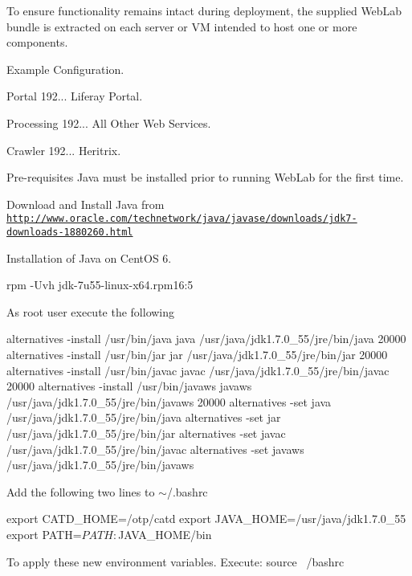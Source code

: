 To ensure functionality remains intact during deployment, the supplied Web\+Lab bundle is extracted on each server or V\+M intended to host one or more components.


\begin{DoxyItemize}
\item Example Configuration.
\begin{DoxyEnumerate}
\item Portal  192... Liferay Portal.
\item Processing  192... All Other Web Services.
\item Crawler  192... Heritrix.
\end{DoxyEnumerate}
\end{DoxyItemize}

Pre-\/requisites Java must be installed prior to running Web\+Lab for the first time.

Download and Install Java from \href{http://www.oracle.com/technetwork/java/javase/downloads/jdk7-downloads-1880260.html}{\tt http\+://www.\+oracle.\+com/technetwork/java/javase/downloads/jdk7-\/downloads-\/1880260.\+html}

Installation of Java on Cent\+O\+S 6. 
\begin{DoxyCode}
rpm -Uvh jdk-7u55-linux-x64.rpm16:5
\end{DoxyCode}


As root user execute the following 
\begin{DoxyCode}
alternatives -install /usr/bin/java java /usr/java/jdk1.7.0\_55/jre/bin/java 20000
alternatives -install /usr/bin/jar jar /usr/java/jdk1.7.0\_55/jre/bin/jar 20000
alternatives -install /usr/bin/javac javac /usr/java/jdk1.7.0\_55/jre/bin/javac 20000
alternatives -install /usr/bin/javaws javaws /usr/java/jdk1.7.0\_55/jre/bin/javaws 20000
alternatives -set java /usr/java/jdk1.7.0\_55/jre/bin/java
alternatives -set jar /usr/java/jdk1.7.0\_55/jre/bin/jar
alternatives -set javac /usr/java/jdk1.7.0\_55/jre/bin/javac
alternatives -set javaws /usr/java/jdk1.7.0\_55/jre/bin/javaws
\end{DoxyCode}


Add the following two lines to $\sim$/.bashrc 
\begin{DoxyCode}
export CATD\_HOME=/otp/catd
export JAVA\_HOME=/usr/java/jdk1.7.0\_55
export PATH=$PATH:$JAVA\_HOME/bin
\end{DoxyCode}



\begin{DoxyCode}
To apply these \textcolor{keyword}{new} environment variables.
 Execute: source ~/bashrc 
\end{DoxyCode}


